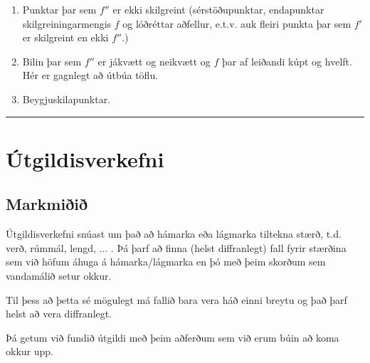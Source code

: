\documentclass[b5paper,11pt,icelandic]{sphinxmanual}
\begin{document}
\begin{enumerate}
\begin{description}
\begin{enumerate}
\item {} 
Punktar þar sem \(f''\) er ekki skilgreint (sérstöðupunktar, endapunktar skilgreiningarmengis \(f\) og lóðréttar aðfellur, e.t.v. auk fleiri punkta þar sem \(f'\) er skilgreint en ekki \(f''\).)

\item {} 
Bilin þar sem \(f''\) er jákvætt og neikvætt og \(f\) þar af leiðandi kúpt og hvelft. Hér er gagnlegt að útbúa töflu.

\item {} 
Beygjuskilapunktar.

\end{enumerate}

\end{description}

\end{enumerate}


\bigskip\hrule{}\bigskip

\newpage
{}

\section{Útgildisverkefni}
\label{kafli05:utgildisverkefni}\label{kafli05:index-5}

\subsection{Markmiðið}
\label{kafli05:markmii}
Útgildisverkefni snúast um það að hámarka eða lágmarka tiltekna stærð, t.d.
verð, rúmmál, lengd, ... . Þá þarf að finna (helst diffranlegt) fall fyrir stærðina
sem við höfum áhuga á hámarka/lágmarka en þó með þeim skorðum sem vandamálið setur okkur.

Til þess að þetta sé mögulegt má fallið bara vera háð einni breytu og
það þarf helst að vera diffranlegt.

Þá getum við fundið útgildi með þeim aðferðum sem við erum búin að koma
okkur upp.
\end{document}

